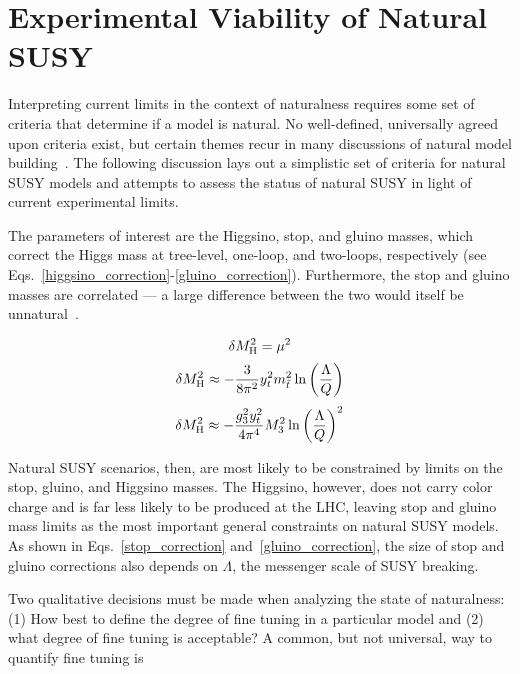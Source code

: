 \documentclass[12pt]{article}
\begin{document}
\section{Experimental Viability of Natural SUSY}
    Interpreting current limits in the context of naturalness requires some set of criteria that determine if a model is natural. No well-defined, universally agreed upon criteria exist, but certain themes recur in many discussions of natural model building~\cite{craig, vestiges, evans_toward_full, feng, cornering, kim}. The following discussion lays out a simplistic set of criteria for natural SUSY models and attempts to assess the status of natural SUSY in light of current experimental limits.
    
    The parameters of interest are the Higgsino, stop, and gluino masses, which correct the Higgs mass at tree-level, one-loop, and two-loops, respectively (see Eqs.~\ref{higgsino_correction}-\ref{gluino_correction}). Furthermore, the stop and gluino masses are correlated --- a large difference between the two would itself be unnatural~\cite{cornering}.

    \noindent \begin{equation}
        \delta M_{\mathrm{H}}^2 = \mu^2
        \label{higgsino_correction}
    \end{equation}
    \noindent \begin{equation}
        \delta M_{\mathrm{H}}^2 \approx - \frac{3}{8\pi^2} y_t^2 m_{\tilde{t}}^2 \ln{\left(\frac{\Lambda}{Q}\right)}
        \label{stop_correction}
    \end{equation}
    \noindent \begin{equation}
        \delta M_{\mathrm{H}}^2 \approx - \frac{g_3^2 y_t^2}{4\pi^4} M_3^2 \ln{\left(\frac{\Lambda}{Q}\right)}^2
        \label{gluino_correction}
    \end{equation}

    Natural SUSY scenarios, then, are most likely to be constrained by limits on the stop, gluino, and Higgsino masses. The Higgsino, however, does not carry color charge and is far less likely to be produced at the LHC, leaving stop and gluino mass limits as the most important general constraints on natural SUSY models. As shown in Eqs.~\ref{stop_correction} and~\ref{gluino_correction}, the size of stop and gluino corrections also depends on $\Lambda$, the messenger scale of SUSY breaking.

    Two qualitative decisions must be made when analyzing the state of naturalness: (1) How best to define the degree of fine tuning in a particular model and (2) what degree of fine tuning is acceptable? A common, but not universal, way to quantify fine tuning is
    
\end{document}
